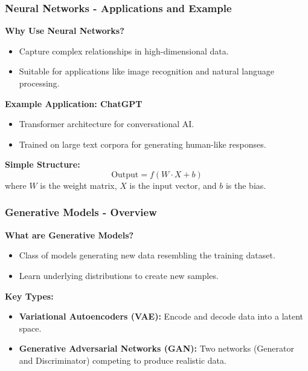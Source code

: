 \documentclass[aspectratio=169]{beamer}
\begin{document}
\begin{frame}[fragile]
    \frametitle{Neural Networks - Applications and Example}
    \textbf{Why Use Neural Networks?}
    \begin{itemize}
        \item Capture complex relationships in high-dimensional data.
        \item Suitable for applications like image recognition and natural language processing.
    \end{itemize}

    \textbf{Example Application: ChatGPT}
    \begin{itemize}
        \item Transformer architecture for conversational AI.
        \item Trained on large text corpora for generating human-like responses.
    \end{itemize}

    \textbf{Simple Structure:}
    \begin{equation}
        \text{Output} = f(W \cdot X + b)
    \end{equation}
    where $W$ is the weight matrix, $X$ is the input vector, and $b$ is the bias.
\end{frame}

\begin{frame}[fragile]
    \frametitle{Generative Models - Overview}
    \textbf{What are Generative Models?}
    \begin{itemize}
        \item Class of models generating new data resembling the training dataset.
        \item Learn underlying distributions to create new samples.
    \end{itemize}

    \textbf{Key Types:}
    \begin{itemize}
        \item \textbf{Variational Autoencoders (VAE):} Encode and decode data into a latent space.
        \item \textbf{Generative Adversarial Networks (GAN):} Two networks (Generator and Discriminator) competing to produce realistic data.
    \end{itemize}
\end{frame}
\end{document}
